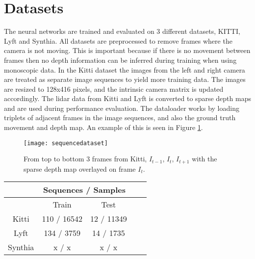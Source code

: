 \section{Datasets}

The neural networks are trained and evaluated on 3 different datasets, KITTI\cite{kitti}, Lyft\cite{lyft2019} and Synthia. All datasets are preprocessed to remove frames where the camera is not moving. This is important because if there is no movement between frames then no depth information can be inferred during training when using monoscopic data. In the Kitti dataset the images from the left and right camera are treated as separate image sequences to yield more training data. The images are resized to 128x416 pixels, and the intrinsic camera matrix is updated accordingly. The lidar data from Kitti and Lyft is converted to sparse depth maps and are used during performance evaluation. The dataloader works by loading triplets of adjacent frames in the image sequences, and also the ground truth movement and depth map. An example of this is seen in Figure \ref{fig:sequencedataset}.

\begin{figure}[H]
	\centering
	\texttt{[image: sequencedataset]}
	\caption{From top to bottom 3 frames from Kitti, $I_{t-1}$, $I_t$, $I_{t+1}$ with the sparse depth map overlayed on frame $I_t$.}
	\label{fig:sequencedataset}
\end{figure}

\begin{center}
	\begin{tabular}{ |c|c|c|c|c| } 
		\hline
		 &\multicolumn{2}{c|}{Sequences / Samples} \\ 
		 \hline
		 & Train & Test \\ 
		\hline
		Kitti & 110 / 16542 & 12 / 11349 \\ 
		\hline
		Lyft & 134 / 3759 & 14 / 1735 \\ 
		\hline
		Synthia & x / x & x / x \\ 
		\hline
	\end{tabular}
\end{center}


